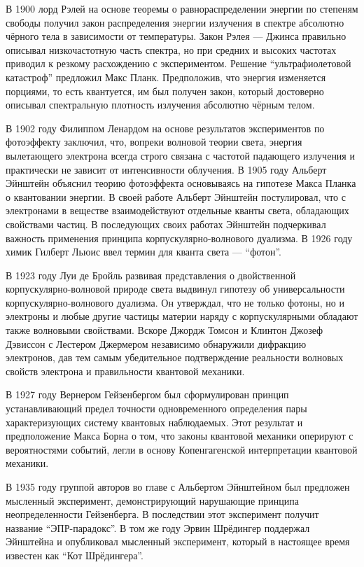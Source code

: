 В 1900 лорд Рэлей на основе теоремы о равнораспределении энергии по степеням свободы 
получил закон распределения энергии излучения в спектре абсолютно чёрного тела в зависимости от температуры. 
Закон Рэлея — Джинса правильно описывал низкочастотную часть спектра,
но при средних и высоких частотах приводил к резкому расхождению с экспериментом.
Решение ``ультрафиолетовой катастроф'' предложил Макс Планк.
Предположив, что энергия изменяется порциями, то есть квантуется, 
им был получен закон, который достоверно описывал спектральную плотность излучения абсолютно чёрным телом. 

В 1902 году Филиппом Ленардом на основе результатов экспериментов по фотоэффекту заключил,
что, вопреки волновой теории света, 
энергия вылетающего электрона всегда строго связана с частотой падающего излучения и практически не зависит от интенсивности облучения.
В 1905 году Альберт Эйнштейн объяснил теорию фотоэффекта основываясь на гипотезе Макса Планка о квантовании энергии. 
В своей работе Альберт Эйнштейн постулировал, 
что с электронами в веществе взаимодействуют отдельные кванты света, 
обладающих свойствами частиц.
В последующих своих работах Эйнштейн подчеркивал важность применения принципа корпускулярно-волнового дуализма. 
В 1926 году химик Гилберт Льюис ввел термин для кванта света --- ``фотон''. 

В 1923 году Луи де Бройль развивая представления о двойственной корпускулярно-волновой природе света 
выдвинул гипотезу об универсальности корпускулярно-волнового дуализма. 
Он утверждал, что не только фотоны, но и электроны и любые другие частицы материи наряду с корпускулярными обладают также волновыми свойствами.
Вскоре Джордж Томсон и Клинтон Джозеф Дэвиссон с Лестером Джермером независимо обнаружили дифракцию электронов, дав тем самым убедительное подтверждение реальности волновых свойств электрона и правильности квантовой механики.

В 1927 году Вернером Гейзенбергом был сформулирован принцип устанавливающий предел точности одновременного определения пары характеризующих систему квантовых наблюдаемых. Этот результат и предположение Макса Борна о том,
что законы квантовой механики оперируют с вероятностями событий, 
легли в основу Копенгагенской интерпретации квантовой механики. 
 
В 1935 году группой авторов во главе с Альбертом Эйнштейном был предложен мысленный эксперимент, 
демонстрирующий нарушающие принципа неопределенности Гейзенберга. 
В последствии этот эксперимент получит название ``ЭПР-парадокс''.
В том же году Эрвин Шрёдингер поддержал Эйнштейна
и опубликовал мысленный эксперимент, 
который в настоящее время известен как ``Кот Шрёдингера''. 

